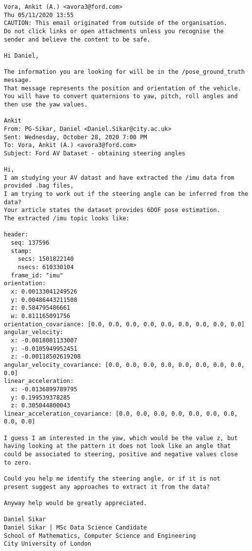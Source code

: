 \begin{verbatim}
Vora, Ankit (A.) <avora3@ford.com>
Thu 05/11/2020 13:55
CAUTION: This email originated from outside of the organisation. 
Do not click links or open attachments unless you recognise the
sender and believe the content to be safe.

Hi Daniel,

The information you are looking for will be in the /pose_ground_truth message. 
That message represents the position and orientation of the vehicle.
You will have to convert quaternions to yaw, pitch, roll angles and
then use the yaw values.

Ankit
From: PG-Sikar, Daniel <Daniel.Sikar@city.ac.uk>
Sent: Wednesday, October 28, 2020 7:00 PM
To: Vora, Ankit (A.) <avora3@ford.com>
Subject: Ford AV Dataset - obtaining steering angles
 
Hi,
I am studying your AV datast and have extracted the /imu data from provided .bag files, 
I am trying to work out if the steering angle can be inferred from the data?
Your article states the dataset provides 6DOF pose estimation.
The extracted /imu topic looks like:

header:
  seq: 137596
  stamp:
    secs: 1501822140
    nsecs: 610330104
  frame_id: "imu"
orientation:
  x: 0.00133041249526
  y: 0.00486443211508
  z: 0.584795486661
  w: 0.811165091756
orientation_covariance: [0.0, 0.0, 0.0, 0.0, 0.0, 0.0, 0.0, 0.0, 0.0]
angular_velocity:
  x: -0.0018081133007
  y: -0.0105949952451
  z: -0.00118502619208
angular_velocity_covariance: [0.0, 0.0, 0.0, 0.0, 0.0, 0.0, 0.0, 0.0, 0.0]
linear_acceleration:
  x: -0.0136899789795
  y: 0.199539378285
  z: 0.305044800043
linear_acceleration_covariance: [0.0, 0.0, 0.0, 0.0, 0.0, 0.0, 0.0, 0.0, 0.0]

I guess I am interested in the yaw, which would be the value z, but
having looking at the pattern it does not look like an angle that
could be associated to steering, positive and negative values close
to zero.

Could you help me identify the steering angle, or if it is not
present suggest any approaches to extract it from the data?

Anyway help would be greatly appreciated.

Daniel Sikar
Daniel Sikar | MSc Data Science Candidate
School of Mathematics, Computer Science and Engineering
City University of London   
\end{verbatim}